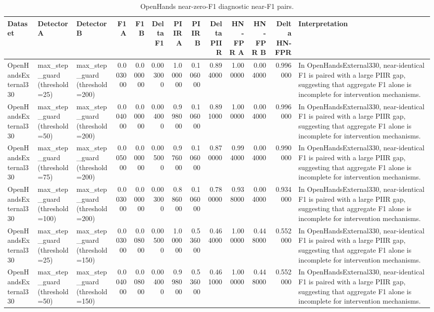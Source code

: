 \begin{table}
\caption{OpenHands near-zero-F1 diagnostic near-F1 pairs.}
\label{tab:appendix_openhands_degenerate_near_f1_pairs}
\begin{tabular}{lllrrrrrrrrrl}
\toprule
Dataset & Detector A & Detector B & F1 A & F1 B & Delta F1 & PIIR A & PIIR B & Delta PIIR & HN-FPR A & HN-FPR B & Delta HN-FPR & Interpretation \\
\midrule
OpenHandsExternal330 & max\_step\_guard (threshold=25) & max\_step\_guard (threshold=200) & 0.003000 & 0.000000 & 0.003000 & 1.000000 & 0.106000 & 0.894000 & 1.000000 & 0.004000 & 0.996000 & In OpenHandsExternal330, near-identical F1 is paired with a large PIIR gap, suggesting that aggregate F1 alone is incomplete for intervention mechanisms. \\
OpenHandsExternal330 & max\_step\_guard (threshold=50) & max\_step\_guard (threshold=200) & 0.004000 & 0.000000 & 0.004000 & 0.998000 & 0.106000 & 0.891000 & 1.000000 & 0.004000 & 0.996000 & In OpenHandsExternal330, near-identical F1 is paired with a large PIIR gap, suggesting that aggregate F1 alone is incomplete for intervention mechanisms. \\
OpenHandsExternal330 & max\_step\_guard (threshold=75) & max\_step\_guard (threshold=200) & 0.005000 & 0.000000 & 0.005000 & 0.976000 & 0.106000 & 0.870000 & 0.994000 & 0.004000 & 0.990000 & In OpenHandsExternal330, near-identical F1 is paired with a large PIIR gap, suggesting that aggregate F1 alone is incomplete for intervention mechanisms. \\
OpenHandsExternal330 & max\_step\_guard (threshold=100) & max\_step\_guard (threshold=200) & 0.003000 & 0.000000 & 0.003000 & 0.886000 & 0.106000 & 0.780000 & 0.938000 & 0.004000 & 0.934000 & In OpenHandsExternal330, near-identical F1 is paired with a large PIIR gap, suggesting that aggregate F1 alone is incomplete for intervention mechanisms. \\
OpenHandsExternal330 & max\_step\_guard (threshold=25) & max\_step\_guard (threshold=150) & 0.003000 & 0.008000 & 0.005000 & 1.000000 & 0.536000 & 0.464000 & 1.000000 & 0.448000 & 0.552000 & In OpenHandsExternal330, near-identical F1 is paired with a large PIIR gap, suggesting that aggregate F1 alone is incomplete for intervention mechanisms. \\
OpenHandsExternal330 & max\_step\_guard (threshold=50) & max\_step\_guard (threshold=150) & 0.004000 & 0.008000 & 0.004000 & 0.998000 & 0.536000 & 0.461000 & 1.000000 & 0.448000 & 0.552000 & In OpenHandsExternal330, near-identical F1 is paired with a large PIIR gap, suggesting that aggregate F1 alone is incomplete for intervention mechanisms. \\

\end{tabular}
\end{table}
